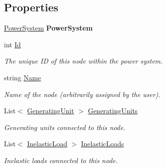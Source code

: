 \subsection*{Properties}
\begin{DoxyCompactItemize}
\item 
\hyperlink{class_power_system_planning_1_1_power_system}{Power\+System} {\bfseries Power\+System}\hypertarget{class_power_system_planning_1_1_node_a20e0f4c3910799d62e610fd10c4623a8}{}\label{class_power_system_planning_1_1_node_a20e0f4c3910799d62e610fd10c4623a8}

\item 
int \hyperlink{class_power_system_planning_1_1_node_abd72649e4b2b83daa0980ab87a90034a}{Id}
\begin{DoxyCompactList}\small\item\em The unique ID of this node within the power system. \end{DoxyCompactList}\item 
string \hyperlink{class_power_system_planning_1_1_node_ac793185992fc6c55ca5e1880f4947e57}{Name}
\begin{DoxyCompactList}\small\item\em Name of the node (arbitrarily assigned by the user). \end{DoxyCompactList}\item 
List$<$ \hyperlink{class_power_system_planning_1_1_generating_unit}{Generating\+Unit} $>$ \hyperlink{class_power_system_planning_1_1_node_ae781a2962ffb2beaba540f4b2f439963}{Generating\+Units}
\begin{DoxyCompactList}\small\item\em Generating units connected to this node. \end{DoxyCompactList}\item 
List$<$ \hyperlink{class_power_system_planning_1_1_inelastic_load}{Inelastic\+Load} $>$ \hyperlink{class_power_system_planning_1_1_node_a242eb347ec0e73927cfcba3ddacc8153}{Inelastic\+Loads}
\begin{DoxyCompactList}\small\item\em Inelastic loads connected to this node. \end{DoxyCompactList}\item 

\end{DoxyCompactItemize}
